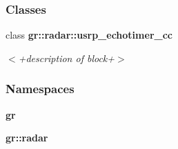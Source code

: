 \subsubsection*{Classes}
\begin{DoxyCompactItemize}
\item 
class {\bf gr\+::radar\+::usrp\+\_\+echotimer\+\_\+cc}
\begin{DoxyCompactList}\small\item\em $<$+description of block+$>$ \end{DoxyCompactList}\end{DoxyCompactItemize}
\subsubsection*{Namespaces}
\begin{DoxyCompactItemize}
\item 
 {\bf gr}
\item 
 {\bf gr\+::radar}
\end{DoxyCompactItemize}
